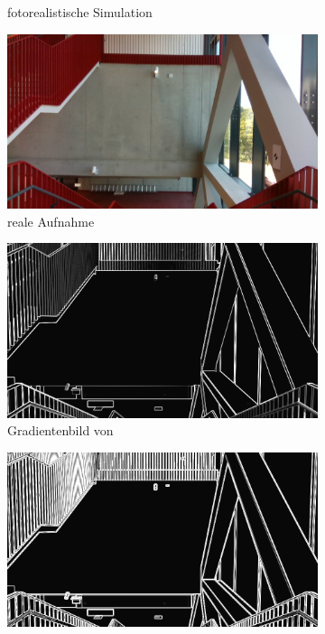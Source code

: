 \begin{figure}
\begin{subfigure}[t]{0.24\linewidth}
		\caption{fotorealistische \hspace{1cm} Simulation}
		\label{subfig:photorealistic}
	\end{subfigure}
	\hfill 
	\begin{subfigure}[t]{0.24\linewidth}
		\centering
		\includegraphics[width=\linewidth]{images/syn_dataset/r000089.png}
		\caption{reale Aufnahme \hspace{2cm}}
		\label{subfig:real}
	\end{subfigure}
	\hfill 
	\begin{subfigure}[t]{0.24\linewidth}
		\centering
		\includegraphics[width=\linewidth]{images/syn_dataset/bg00188.png}
		\caption{Gradientenbild  \hspace{1cm} von }
	\end{subfigure}
	\hfill
	\begin{subfigure}[t]{0.24\linewidth}
		\centering
		\includegraphics[width=\linewidth]{images/syn_dataset/eg00188.png}

\end{subfigure}
\end{figure}
